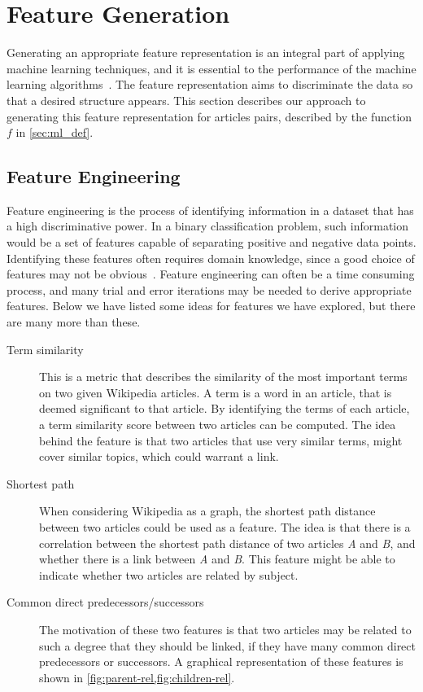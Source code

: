 \section{Feature Generation}\label{sec:feature_generation}
Generating an appropriate feature representation is an integral part of applying machine learning techniques, and it is essential to the performance of the machine learning algorithms~\cite{ng-lecture}. The feature representation aims to discriminate the data so that a desired structure appears. This section describes our approach to generating this feature representation for articles pairs, described by the function $f$ in \cref{sec:ml_def}.

\subsection{Feature Engineering}
Feature engineering is the process of identifying information in a dataset that has a high discriminative power. In a binary classification problem, such information would be a set of features capable of separating positive and negative data points. Identifying these features often requires domain knowledge, since a good choice of features may not be obvious~\cite{ng-lecture}. Feature engineering can often be a time consuming process, and many trial and error iterations may be needed to derive appropriate features. Below we have listed some ideas for features we have explored, but there are many more than these.

\begin{description}
    \item[Term similarity] This is a metric that describes the similarity of the most important terms on two given Wikipedia articles. A term is a word in an article, that is deemed significant to that article. By identifying the terms of each article, a term similarity score between two articles can be computed. The idea behind the feature is that two articles that use very similar terms, might cover similar topics, which could warrant a link.
    \item[Shortest path] When considering Wikipedia as a graph, the shortest path distance between two articles could be used as a feature. The idea is that there is a correlation between the shortest path distance of two articles \emph{A} and \emph{B}, and whether there is a link between \emph{A} and \emph{B}. This feature might be able to indicate whether two articles are related by subject.
    \item[Common direct predecessors/successors] The motivation of these two features is that two articles may be related to such a degree that they should be linked, if they have many common direct predecessors or successors. A graphical representation of these features is shown in \cref{fig:parent-rel,fig:children-rel}.
\end{description}

